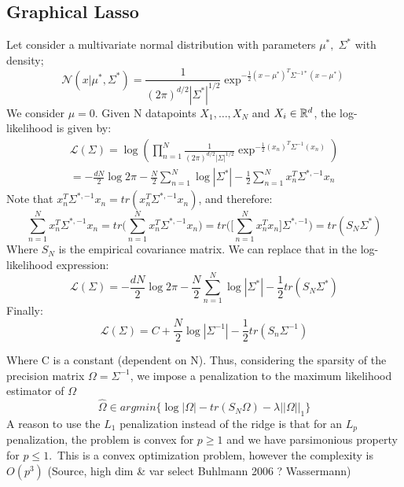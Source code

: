 \subsection{Graphical Lasso}
Let consider a multivariate normal distribution with parameters $\mu^*,\; \Sigma^*$ with density;
\begin{equation}
\mathcal N(x|\mu^*,\Sigma^*)
=\frac{1}{(2\pi)^{d/2}|\Sigma^*|^{1/2}}\exp^{-\frac{1}{2}(x-\mu^*)^T\Sigma^{-1*}(x-\mu^*)}
\end{equation}
We consider $\mu=0$. Given N datapoints $X_1,\dots,X_N$ and $X_i \in {\mathbb R}^d$, the log-likelihood is given by:
\begin{equation}
\begin{split}
\mathcal{L}(\Sigma)=\log\left(\prod_{n=1}^N\frac{1}{(2\pi)^{d/2}|\Sigma|^{1/2}}\exp^{-\frac{1}{2}(x_n)^T\Sigma^{-1}(x_n)}\right)\\
=-\frac{dN}{2}\log 2\pi - \frac{N}{2}\sum_{n=1}^N\log |\Sigma^*|- \frac{1}{2}\sum_{n=1}^N x_n^T\Sigma^{*,-1}x_n
\end{split}
\end{equation}
Note that $x_n^T\Sigma^{*,-1}x_n=tr(x_n^T\Sigma^{*,-1}x_n)$, and therefore:
\begin{equation}
\sum_{n=1}^N x_n^T\Sigma^{*,-1}x_n=tr\big(\sum_{n=1}^N x_n^T\Sigma^{*,-1}x_n\big)=tr\Big(\big[\sum_{n=1}^N x_n^Tx_n\big]\Sigma^{*,-1}\Big)=tr(S_N\Sigma^*)
\end{equation}
Where $S_N$ is the empirical covariance matrix. We can replace that in the log-likelihood expression:
\begin{equation}
\mathcal{L}(\Sigma)=-\frac{dN}{2}\log 2\pi - \frac{N}{2}\sum_{n=1}^N\log |\Sigma^*|- \frac{1}{2}tr(S_N\Sigma^*)
\end{equation}
Finally:
\begin{equation}
\mathcal{L}(\Sigma)=C+\frac{N}{2}\log|\Sigma^{-1}|-\frac{1}{2} tr(S_n\Sigma^{-1})
\end{equation}

Where C is a constant (dependent on N). Thus, considering the sparsity of the precision matrix $\Omega=\Sigma^{-1}$, we impose a penalization to the maximum likelihood estimator of $\Omega$
\begin{equation}
\hat\Omega\in argmin\big\{ \log|\Omega|-tr(S_N\Omega)-\lambda||\Omega||_1   \big\}
\end{equation}
A reason to use the $L_1$ penalization instead of the ridge is that for an $L_p$ penalization, the problem is convex for $p\geq 1$ and we have parsimonious property for $p\leq 1$.\
This is a convex optimization problem, however the complexity is $O(p^3)$ (Source, high dim \& var select Buhlmann 2006 ? Wassermann)

